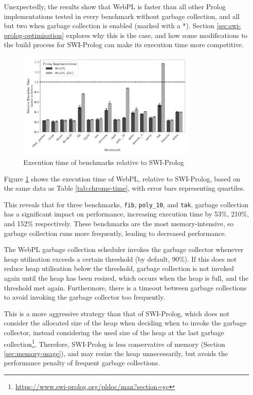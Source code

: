\vspace*{-1.5em}

Unexpectedly, the results show that WebPL is faster than all other Prolog implementations tested in every benchmark without garbage collection, and all but two when garbage collection is enabled (marked with a *). Section \ref{sec:swi-prolog-optimisation} explores why this is the case, and how some modifications to the build process for SWI-Prolog can make its execution time more competitive.

\begin{figure}[H]
\centering
\includegraphics[width=0.8\textwidth]{relative_performance.pdf}
\caption{Execution time of benchmarks relative to SWI-Prolog}
\label{fig:relative-performance}
\end{figure}

Figure \ref{fig:relative-performance} shows the execution time of WebPL, relative to SWI-Prolog, based on the same data as Table \ref{tab:chrome-time}, with error bars representing quartiles.

This reveals that for three benchmarks, \texttt{fib}, \texttt{poly\_10}, and \texttt{tak}, garbage collection has a significant impact on performance, increasing execution time by 53\%, 210\%, and 152\% respectively. These benchmarks are the most memory-intensive, so garbage collection runs more frequently, leading to decreased performance.

The WebPL garbage collection scheduler invokes the garbage collector whenever heap utilisation exceeds a certain threshold (by default, 90\%). If this does not reduce heap utilisation below the threshold, garbage collection is not invoked again until the heap has been resized, which occurs when the heap is full, and the threshold met again. Furthermore, there is a timeout between garbage collections to avoid invoking the garbage collector too frequently.

This is a more aggressive strategy than that of SWI-Prolog, which does not consider the allocated size of the heap when deciding when to invoke the garbage collector, instead considering the used size of the heap at the last garbage collection\footnote{\url{https://www.swi-prolog.org/pldoc/man?section=gc}}. Therefore, SWI-Prolog is less conservative of memory (Section \ref{sec:memory-usage}), and may resize the heap unnecessarily, but avoids the performance penalty of frequent garbage collections.

